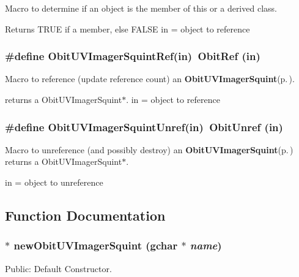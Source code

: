 Macro to determine if an object is the member of this or a derived class. 

Returns TRUE if a member, else FALSE in = object to reference 
\subsubsection{\setlength{\rightskip}{0pt plus 5cm}\#define Obit\-UVImager\-Squint\-Ref(in)\ Obit\-Ref (in)}\label{ObitUVImagerSquint_8h_a1}


Macro to reference (update reference count) an {\bf Obit\-UVImager\-Squint}{\rm (p.\,\pageref{structObitUVImagerSquint})}. 

returns a Obit\-UVImager\-Squint$\ast$. in = object to reference 
\subsubsection{\setlength{\rightskip}{0pt plus 5cm}\#define Obit\-UVImager\-Squint\-Unref(in)\ Obit\-Unref (in)}\label{ObitUVImagerSquint_8h_a0}


Macro to unreference (and possibly destroy) an {\bf Obit\-UVImager\-Squint}{\rm (p.\,\pageref{structObitUVImagerSquint})} returns a Obit\-UVImager\-Squint$\ast$. 

in = object to unreference 

\subsection{Function Documentation}
\subsubsection{$\ast$ new\-Obit\-UVImager\-Squint (gchar $\ast$ {\em name})}\label{ObitUVImagerSquint_8h_a4}


Public: Default Constructor. 

